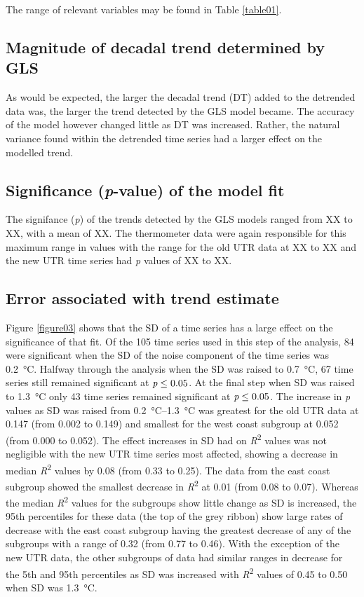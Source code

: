 \documentclass{ametsoc}
\begin{document}
The range of relevant variables may be found in Table \ref{table01}.

\subsection{Magnitude of decadal trend determined by GLS}
As would be expected, the larger the decadal trend (DT) added to the detrended data was, the larger the trend detected by the GLS model became. The accuracy of the model however changed little as DT was increased. Rather, the natural variance found within the detrended time series had a larger effect on the modelled trend.

\subsection{Significance (\emph{p}-value) of the model fit}
The signifance (\emph{p}) of the trends detected by the GLS models ranged from XX to XX, with a mean of XX. The thermometer data were again responsible for this maximum range in values with the range for the old UTR data at XX to XX and the new UTR time series had  \emph{p} values of XX to XX.

\subsection{Error associated with trend estimate}
Figure \ref{figure03} shows that the SD of a time series has a large effect on the significance of that fit. Of the 105 time series used in this step of the analysis, 84 were significant when the SD of the noise component of the time series was \SI{0.2}{\degreeCelsius}. Halfway through the analysis when the SD was raised to \SI{0.7}{\degreeCelsius}, 67 time series still remained significant at $\emph{p} \leq 0.05$. At the final step when SD was raised to \SI{1.3}{\degreeCelsius} only 43 time series remained significant at $\emph{p} \leq 0.05$. The increase in \emph{p} values as SD was raised from \SIrange{0.2}{1.3}{\degreeCelsius} was greatest for the old UTR data at 0.147 (from 0.002 to 0.149) and smallest for the west coast subgroup at 0.052 (from 0.000 to 0.052). The effect increases in SD had on \emph{R}\textsuperscript{2} values was not negligible with the new UTR time series most affected, showing a decrease in median \emph{R}\textsuperscript{2} values by 0.08 (from 0.33 to 0.25). The data from the east coast subgroup showed the smallest decrease in \emph{R}\textsuperscript{2} at 0.01 (from 0.08 to 0.07). Whereas the median \emph{R}\textsuperscript{2} values for the subgroups show little change as SD is increased, the 95th percentiles for these data (the top of the grey ribbon) show large rates of decrease with the east coast subgroup having the greatest decrease of any of the subgroups with a range of 0.32 (from 0.77 to 0.46). With the exception of the new UTR data, the other subgroups of data had similar ranges in decrease for the 5th and 95th percentiles as SD was increased with \emph{R}\textsuperscript{2} values of 0.45 to 0.50 when SD was \SI{1.3}{\degreeCelsius}.
\end{document}
